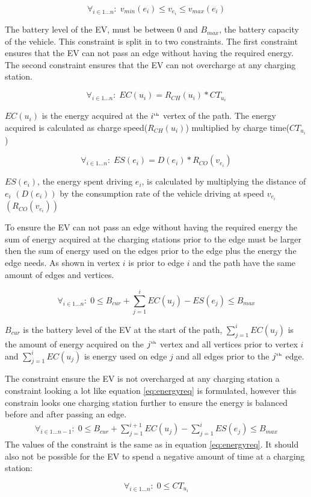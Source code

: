 \begin{equation*}
\forall_{i\in1 \dots n }:\;v_{min}(e_i) \leq v_{e_i} \leq v_{max}(e_i)
\end{equation*}

The battery level of the EV, must be between $0$ and $B_{max}$, the battery capacity of the vehicle.
This constraint is split in to two constraints. The first constraint ensures that the EV can not pass an edge without having the required energy. The second constraint ensures that the EV can not overcharge at any charging station.

\begin{equation*}
\forall_{i\in1 \dots n }:\; EC(u_i) = R_{CH}(u_i) * CT_{u_i}
\end{equation*}

$EC(u_i)$ is the energy acquired at the $i^{\text{\tiny th}}$ vertex of the path. The energy acquired is calculated as charge speed($R_{CH}(u_i)$) multiplied by charge time($CT_{u_i}$)

\begin{equation*}
\forall_{i\in1 \dots n }:\; ES(e_i) = D(e_i)*R_{CO}(v_{e_i})
\end{equation*}

$ES(e_i)$, the energy spent driving $e_i$, is calculated by multiplying the distance of $e_i$ $(D(e_i))$ by the consumption rate of the vehicle driving at speed $v_{e_i}$ $(R_{CO}(v_{e_i}))$

To ensure the EV can not pass an edge without having the required energy the sum of energy acquired at the charging stations prior to the edge must be larger then the sum of energy used on the edges prior to the edge plus the energy the edge needs. As shown in  vertex $i$ is prior to edge $i$ and the path have the same amount of edges and vertices.

\begin{equation*}
\forall_{i\in1 \dots n }:\;0 \leq B_{cur} + \sum_{j=1}^{i} EC(u_j) - ES(e_j) \leq B_{max}
\end{equation*}\label{eq:energyreq}

$B_{cur}$ is the battery level of the EV at the start of the path, $ \sum_{j=1}^{i} EC(u_j)$ is the amount of energy acquired on the $j^{\text{\tiny th}}$ vertex and all vertices prior to vertex $i$ and $\sum_{j=1}^{i} EC(u_j)$ is energy used on edge $j$ and all edges prior to the $j^{\text{\tiny th}}$ edge.

The constraint ensure the EV is not overcharged at any charging station a constraint looking a lot like equation \ref{eq:energyreq} is formulated, however this constrain looks one charging station further to ensure the energy is balanced before and after passing an edge.
\begin{equation*}
\begin{aligned}
\forall_{i\in1 \dots n-1}:\;0 \leq B_{cur} + \sum_{j=1}^{i+1} EC(u_j) - \sum_{j=1}^{i} ES(e_j) \leq B_{max}
\end{aligned}
\end{equation*}
The values of the constraint is the same as in equation \ref{eq:energyreq}. It should also not be possible for the EV to spend a negative amount of time at a charging station:

\begin{equation*}
\forall_{i\in1 \dots n }:\; 0 \leq CT_{u_i}
\end{equation*}